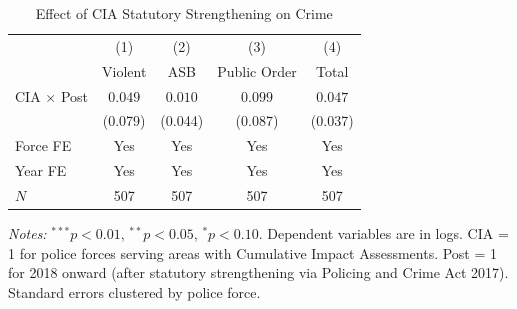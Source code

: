 \begin{table}[H]
\centering
\caption{Effect of CIA Statutory Strengthening on Crime}
\label{tab:main}
\begin{threeparttable}
\begin{tabular}{lcccc}
\toprule
 & (1) & (2) & (3) & (4) \\
 & Violent & ASB & Public Order & Total \\
\midrule
CIA $\times$ Post & $0.049$ & $0.010$ & $0.099$ & $0.047$ \\
 & (0.079) & (0.044) & (0.087) & (0.037) \\
Force FE & Yes & Yes & Yes & Yes \\
Year FE & Yes & Yes & Yes & Yes \\
$N$ & 507 & 507 & 507 & 507 \\
\bottomrule
\end{tabular}
\begin{tablenotes}[flushleft]
\footnotesize
\item \textit{Notes:} $^{***}p<0.01$, $^{**}p<0.05$, $^{*}p<0.10$. Dependent variables are in logs. CIA = 1 for police forces serving areas with Cumulative Impact Assessments. Post = 1 for 2018 onward (after statutory strengthening via Policing and Crime Act 2017). Standard errors clustered by police force.
\end{tablenotes}
\end{threeparttable}
\end{table}
